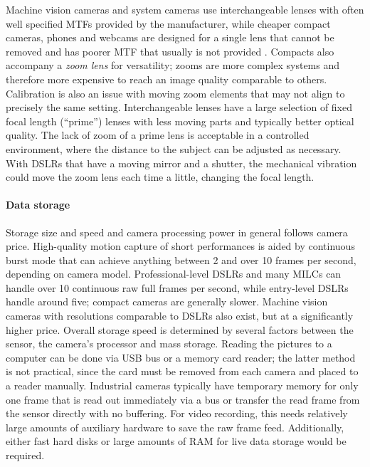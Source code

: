 Machine vision cameras and system cameras use interchangeable lenses with often well specified MTFs provided by the manufacturer, while cheaper compact cameras, phones and webcams are designed for a single lens that cannot be removed and has poorer MTF that usually is not provided \cite{sick2006machine}.
Compacts also accompany a \emph{zoom lens} for versatility; zooms are more complex systems and therefore more expensive to reach an image quality comparable to others.
Calibration is also an issue with moving zoom elements that may not align to precisely the same setting.
Interchangeable lenses have a large selection of fixed focal length (``prime'') lenses with less moving parts and typically better optical quality.
The lack of zoom of a prime lens is acceptable in a controlled environment, where the distance to the subject can be adjusted as necessary.
With DSLRs that have a moving mirror and a shutter, the mechanical vibration could move the zoom lens each time a little, changing the focal length.


\paragraph{Data storage}
Storage size and speed and camera processing power in general follows camera price.
High-quality motion capture of short performances is aided by continuous burst mode that can achieve anything between 2 and over 10 frames per second, depending on camera model.
Professional-level DSLRs and many MILCs can handle over 10 continuous raw full frames per second, while entry-level DSLRs handle around five;
compact cameras are generally slower.
Machine vision cameras with resolutions comparable to DSLRs also exist, but at a significantly higher price.
Overall storage speed is determined by several factors between the sensor, the camera's processor and mass storage.
Reading the pictures to a computer can be done via USB bus or a memory card reader; the latter method is not practical, since the card must be removed from each camera and placed to a reader manually.
Industrial cameras typically have temporary memory for only one frame that is read out immediately via a bus or transfer the read frame from the sensor directly with no buffering.
For video recording, this needs relatively large amounts of auxiliary hardware to save the raw frame feed.
Additionally, either fast hard disks or large amounts of RAM for live data storage would be required.

